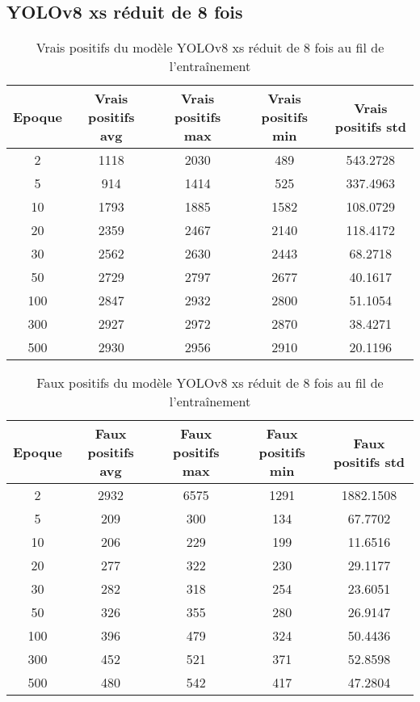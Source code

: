 
\clearpage
\subsection{YOLOv8 xs réduit de 8 fois}

\begin{table}[!ht]
    \caption{Vrais positifs du modèle YOLOv8 xs réduit de 8 fois au fil de l'entraînement}
    \label{tab:yolov8xs_reduced8x_true_positive}
    \centering
    \begin{tabular}{ |c||c|c|c|c|  }
        \hline
        \rowcolor{gray!50}
        Epoque & Vrais positifs avg & Vrais positifs max & Vrais positifs min & Vrais positifs std\\
        \hline
        2 & 1118 & 2030 & 489 & 543.2728\\
        5 & 914 & 1414 & 525 & 337.4963\\
        10 & 1793 & 1885 & 1582 & 108.0729\\
        20 & 2359 & 2467 & 2140 & 118.4172\\
        30 & 2562 & 2630 & 2443 & 68.2718\\
        50 & 2729 & 2797 & 2677 & 40.1617\\
        100 & 2847 & 2932 & 2800 & 51.1054\\
        300 & 2927 & 2972 & 2870 & 38.4271\\
        500 & 2930 & 2956 & 2910 & 20.1196\\
        \hline
    \end{tabular}
\end{table}

\begin{table}[!ht]
    \caption{Faux positifs du modèle YOLOv8 xs réduit de 8 fois au fil de l'entraînement}
    \label{tab:yolov8xs_reduced8x_false_positive}
    \centering
    \begin{tabular}{ |c||c|c|c|c|  }
        \hline
        \rowcolor{gray!50}
        Epoque & Faux positifs avg & Faux positifs max & Faux positifs min & Faux positifs std\\
        \hline
        2 & 2932 & 6575 & 1291 & 1882.1508\\
        5 & 209 & 300 & 134 & 67.7702\\
        10 & 206 & 229 & 199 & 11.6516\\
        20 & 277 & 322 & 230 & 29.1177\\
        30 & 282 & 318 & 254 & 23.6051\\
        50 & 326 & 355 & 280 & 26.9147\\
        100 & 396 & 479 & 324 & 50.4436\\
        300 & 452 & 521 & 371 & 52.8598\\
        500 & 480 & 542 & 417 & 47.2804\\
        \hline
    \end{tabular}
\end{table}

